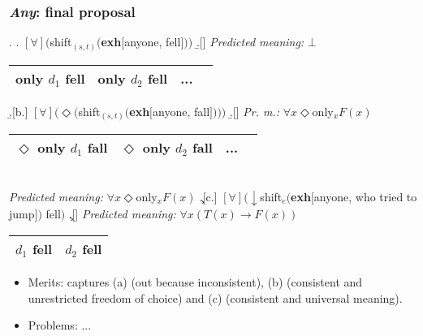 \documentclass{beamer}
\newcommand{\bit}{\begin{itemize}}
\newcommand{\eit}{\end{itemize}}
\newcommand{\btar}{\begin{tabular}}
\newcommand{\etar}{\end{tabular}}
\begin{document}
\frame
{\frametitle{\emph{Any}: final proposal}



\ex. \label{mine}
\a.  $[\forall] (  ${\sc shift}$_{(s,t)}(${\bf exh}$[$anyone$ $, $ $fell$]))$  
\vspace{0,3cm}
\b.[]  {\it Predicted meaning:} $\bot$ \ \hfill  {\scriptsize \btar{|c|c|c|c|}  \hline   only  $d_1$ fell  &  only  $d_2$ fell   & ...
 \\
  \hline
\etar
  }   
  \vspace{0,3cm}
 \b.[b.]   $[\forall] ( \Diamond    ( ${\sc shift}$_{(s,t)}(${\bf exh}$[$anyone,   fall$] )))$ \vspace{0,3cm}
 \b.[]  {\it Pr. m.:} $\forall x \Diamond
 ${\sc only}$_x F(x)$   \ \hfill    {\scriptsize \btar{|c|c|c|c|}  \hline $\Diamond $ only $d_1$ fall  &  $\Diamond $ only $d_2$ fall  &   ...
 \\
  \hline
\etar
  }
   \\ \vspace{0,2cm}  {\it Predicted meaning:} $\forall x \Diamond
 ${\sc only}$_x F(x)$    
  \vspace{0,3cm}
\c.[c.]  $[\forall] (  \downarrow ${\sc shift}$_{e}(${\bf exh}$[$anyone,  who tried to jump$])$ fell$)$ 
\vspace{0,3cm}
\c.[] {\it Predicted meaning:} $\forall x(T(x) \to F(x))$ \ \hfill  {\scriptsize \btar{|c|c|}  \hline $d_1$ fell  &     $d_2$ fell     \\
 \hline
\etar }


\bit
\item {\sc Merits}: captures (a) (out because inconsistent), (b) (consistent and unrestricted freedom of choice) and (c) (consistent and universal meaning).
\item {\sc Problems}: ...

\eit}
\end{document}
